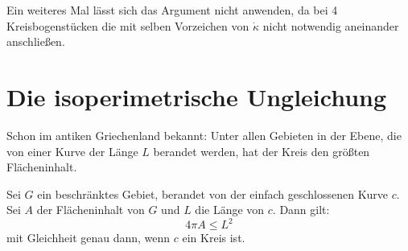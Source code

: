 \documentclass[11pt]{scrbook}
\begin{document}
\begin{note*}
Ein weiteres Mal lässt sich das Argument nicht anwenden, da bei 4 Kreisbogenstücken die mit selben Vorzeichen von $\dot \kappa$ nicht notwendig aneinander anschließen.
\end{note*}

\section{Die isoperimetrische Ungleichung}
Schon im antiken Griechenland bekannt: Unter allen Gebieten in der Ebene, die von einer Kurve der Länge $L$ berandet werden, hat der Kreis den größten Flächeninhalt.

\begin{st}\label{6.1}
Sei $G$ ein beschränktes Gebiet, berandet von der einfach geschlossenen Kurve $c$. Sei $A$ der Flächeninhalt von $G$ und $L$ die Länge von $c$. Dann gilt: \[ 4 \pi A \leq L^2 \]
mit Gleichheit genau dann, wenn $c$ ein Kreis ist.
\end{st}
\end{document}
